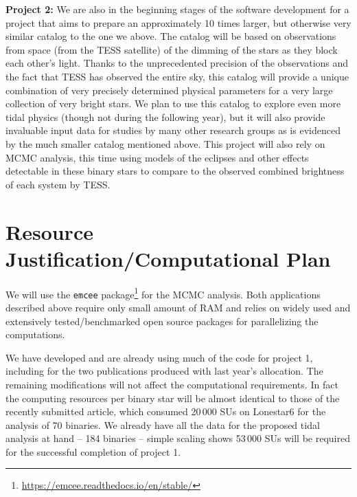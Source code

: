 \documentclass{article}
\begin{document}
\textbf{Project 2:} We are also in the beginning stages of the software
development for a project that aims to prepare an approximately 10 times larger,
but otherwise very similar catalog to the one we above. The catalog will be
based on observations from space (from the TESS satellite) of the dimming of the
stars as they block each other's light. Thanks to the unprecedented precision of
the observations and the fact that TESS has observed the entire sky, this
catalog will provide a unique combination of very precisely determined physical
parameters for a very large collection of very bright stars. We plan to use this
catalog to explore even more tidal physics (though not during the following
year), but it will also provide invaluable input data for studies by many other
research groups as is evidenced by the much smaller catalog mentioned above.
This project will also rely on MCMC analysis, this time using models of the
eclipses and other effects detectable in these binary stars to compare to the
observed combined brightness of each system by TESS.

\section{Resource Justification/Computational Plan}

We will use the \texttt{emcee}
package\footnote{\url{https://emcee.readthedocs.io/en/stable/}} for the MCMC
analysis. Both applications described above require only small amount of RAM and
relies on widely used and extensively tested/benchmarked open source packages
for parallelizing the computations.

We have developed and are already using much of the code for project 1,
including for the two publications produced with last year's allocation.  The
remaining modifications will not affect the computational requirements. In fact
the computing resources per binary star will be almost identical to those of the
recently submitted article, which consumed 20\,000 SUs on Lonestar6 for the
analysis of 70 binaries. We already have all the data for the proposed tidal
analysis at hand -- 184 binaries -- simple scaling shows 53\,000 SUs will be
required for the successful completion of project 1.
\end{document}
